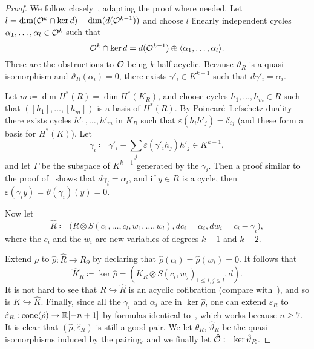\begin{proof}
  We follow closely~\cite[Sections~4 and~5]{LambrechtsStanley2008}, adapting the proof where needed.
  Let $l = \dim(\mathcal{O}^{k} \cap \ker d) - \dim(d(\mathcal{O}^{k-1}))$ and choose $l$ linearly independent cycles $\alpha_{1}, \dots, \alpha_{l} \in \mathcal{O}^{k}$ such that
  \begin{equation}
    \mathcal{O}^{k} \cap \ker d = d(\mathcal{O}^{k-1}) \oplus \langle \alpha_{1}, \dots, \alpha_{l} \rangle.
  \end{equation}
  These are the obstructions to $\mathcal{O}$ being $k$-half acyclic.
  Because $\vartheta_{R}$ is a quasi-isomorphism and $\vartheta_{R}(\alpha_{i}) = 0$, there exists $\gamma'_{i} \in K^{k-1}$ such that $d\gamma'_{i} = \alpha_{i}$.

  Let $m \coloneqq \dim H^{*}(R) = \dim H^{*}(K_{R})$, and choose cycles $h_{1}, \dots, h_{m} \in R$ such that $([h_{1}], \dots, [h_{m}])$ is a basis of $H^{*}(R)$.
  By Poincaré--Lefschetz duality there exists cycles $h'_{1}, \dots, h'_{m}$ in $K_{R}$ such that $\varepsilon(h_{i} h'_{j}) = \delta_{ij}$ (and these form a basis for $H^{*}(K)$).
  Let
  \begin{equation}
    \gamma_{i} \coloneqq \gamma'_{i} - \sum_{j} \varepsilon(\gamma'_{i} h_{j}) h'_{j} \in K^{k-1},
  \end{equation}
  and let $\Gamma$ be the subspace of $K^{k-1}$ generated by the $\gamma_{i}$.
  Then a proof similar to the proof of~\cite[Lemma~4.1]{LambrechtsStanley2008} shows that $d\gamma_{i} = \alpha_{i}$, and if $y \in R$ is a cycle, then $\varepsilon(\gamma_{i} y) = \vartheta(\gamma_{i})(y) = 0$.

  Now let
  \begin{equation}
    \hat{R} \coloneqq \bigl( R \otimes S(c_{1}, \dots, c_{l}, w_{1}, \dots, w_{l}), dc_{i} = \alpha_{i}, dw_{i} = c_{i} - \gamma_{i} \bigr),
  \end{equation}
  where the $c_{i}$ and the $w_{i}$ are new variables of degrees $k-1$ and $k-2$.

  Extend $\rho$ to $\hat{\rho} : \hat{R} \to R_{\partial}$ by declaring that $\hat{\rho}(c_{i}) = \hat{\rho}(w_{i}) = 0$.
  It follows that
  \begin{equation}
    \hat{K}_{R} \coloneqq \ker \hat{\rho} = (K_{R} \otimes S(c_{i}, w_{j})_{1 \leq i, j \leq l}, d).
  \end{equation}
  It is not hard to see that $R \hookrightarrow \hat{R}$ is an acyclic cofibration (compare with~\cite[Lemma~4.2]{LambrechtsStanley2008}), and so is $K \hookrightarrow \hat{K}$.
  Finally, since all the $\gamma_{i}$ and $\alpha_{i}$ are in $\ker \hat{\rho}$, one can extend $\varepsilon_{R}$ to $\hat{\varepsilon}_{R} : \operatorname{cone}(\hat{\rho}) \to \mathbb{R}[-n+1]$ by formulas identical to~\cite[Equation~4.5]{LambrechtsStanley2008}, which works because $n \geq 7$.
  It is clear that $(\hat{\rho}, \hat{\varepsilon}_{R})$ is still a good pair.
  We let $\hat{\theta}_{R}$, $\hat{\vartheta}_{R}$ be the quasi-isomorphisms induced by the pairing, and we finally let $\hat{\mathcal{O}} \coloneqq \ker \hat{\vartheta}_{R}$.


\end{proof}
